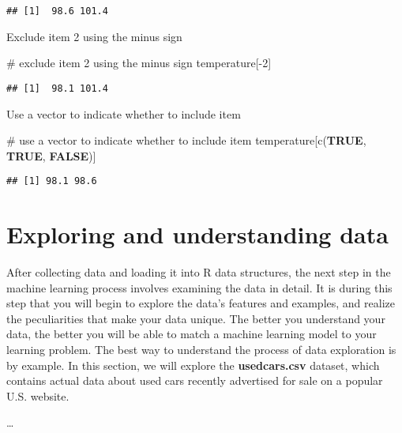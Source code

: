 \documentclass[
]{article}
\newenvironment{Shaded}{\begin{snugshade}}{\end{snugshade}}
\newcommand{\CommentTok}[1]{\textcolor[rgb]{0.50,0.62,0.50}{#1}}
\newcommand{\ConstantTok}[1]{\textcolor[rgb]{0.86,0.64,0.64}{\textbf{#1}}}
\newcommand{\DecValTok}[1]{\textcolor[rgb]{0.86,0.86,0.80}{#1}}
\newcommand{\FunctionTok}[1]{\textcolor[rgb]{0.94,0.94,0.56}{#1}}
\newcommand{\NormalTok}[1]{\textcolor[rgb]{0.80,0.80,0.80}{#1}}
\newcommand{\SpecialCharTok}[1]{\textcolor[rgb]{0.86,0.64,0.64}{#1}}
\begin{document}
\begin{verbatim}
## [1]  98.6 101.4
\end{verbatim}

Exclude item 2 using the minus sign

\begin{Shaded}
\begin{Highlighting}[]
\CommentTok{\# exclude item 2 using the minus sign}
\NormalTok{temperature[}\SpecialCharTok{{-}}\DecValTok{2}\NormalTok{]}
\end{Highlighting}
\end{Shaded}

\begin{verbatim}
## [1]  98.1 101.4
\end{verbatim}

Use a vector to indicate whether to include item

\begin{Shaded}
\begin{Highlighting}[]
\CommentTok{\# use a vector to indicate whether to include item}
\NormalTok{temperature[}\FunctionTok{c}\NormalTok{(}\ConstantTok{TRUE}\NormalTok{, }\ConstantTok{TRUE}\NormalTok{, }\ConstantTok{FALSE}\NormalTok{)]}
\end{Highlighting}
\end{Shaded}

\begin{verbatim}
## [1] 98.1 98.6
\end{verbatim}

\hypertarget{exploring-and-understanding-data}{%
\section{Exploring and understanding
data}\label{exploring-and-understanding-data}}

After collecting data and loading it into R data structures, the next
step in the machine learning process involves examining the data in
detail. It is during this step that you will begin to explore the data's
features and examples, and realize the peculiarities that make your data
unique. The better you understand your data, the better you will be able
to match a machine learning model to your learning problem. The best way
to understand the process of data exploration is by example. In this
section, we will explore the \textbf{usedcars.csv} dataset, which
contains actual data about used cars recently advertised for sale on a
popular U.S. website.

\ldots{}
\end{document}
